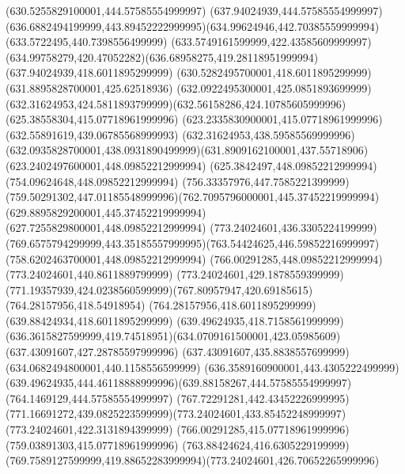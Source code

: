 {{	\closepath
	\moveto(630.5255829100001,444.57585554999997)
	\lineto(637.94024939,444.57585554999997)
	\curveto(636.6882494199999,443.89452222999995)(634.99624946,442.70385559999994)(633.5722495,440.7398556499999)
	\closepath
	\moveto(633.5749161599999,422.43585609999997)
	\curveto(634.99758279,420.47052282)(636.68958275,419.28118951999994)(637.94024939,418.6011895299999)
	\lineto(630.5282495700001,418.6011895299999)
	\closepath
	\moveto(631.8895828700001,425.62518936)
	\curveto(632.0922495300001,425.0851893699999)(632.31624953,424.5811893799999)(632.56158286,424.10785605999996)
	\lineto(625.38558304,415.07718961999996)
	\lineto(623.2335830900001,415.07718961999996)
	\closepath
	\moveto(632.55891619,439.06785568999993)
	\curveto(632.31624953,438.59585569999996)(632.0935828700001,438.0931890499999)(631.8909162100001,437.55718906)
	\lineto(623.2402497600001,448.09852212999994)
	\lineto(625.3842497,448.09852212999994)
	\closepath
	\moveto(754.09624648,448.09852212999994)
	\curveto(756.33357976,447.7585221399999)(759.50291302,447.01185548999996)(762.7095796000001,445.37452219999994)
	\lineto(629.8895829200001,445.37452219999994)
	\lineto(627.7255829800001,448.09852212999994)
	\closepath
	\moveto(773.24024601,436.3305224199999)
	\curveto(769.6575794299999,443.35185557999995)(763.54424625,446.59852216999997)(758.6202463700001,448.09852212999994)
	\lineto(766.00291285,448.09852212999994)
	\lineto(773.24024601,440.8611889799999)
	\closepath
	\moveto(773.24024601,429.1878559399999)
	\curveto(771.19357939,424.0238560599999)(767.80957947,420.69185615)(764.28157956,418.54918954)
	\lineto(764.28157956,418.6011895299999)
	\lineto(639.88424934,418.6011895299999)
	\curveto(639.49624935,418.7158561999999)(636.3615827599999,419.74518951)(634.0709161500001,423.05985609)
	\lineto(637.43091607,427.28785597999996)
	\lineto(637.43091607,435.8838557699999)
	\lineto(634.0682494800001,440.1158556599999)
	\curveto(636.3589160900001,443.4305222499999)(639.49624935,444.46118888999996)(639.88158267,444.57585554999997)
	\lineto(764.1469129,444.57585554999997)
	\curveto(767.72291281,442.43452226999995)(771.16691272,439.0825223599999)(773.24024601,433.85452248999997)
	\closepath
	\moveto(773.24024601,422.3131894399999)
	\lineto(766.00291285,415.07718961999996)
	\lineto(759.03891303,415.07718961999996)
	\curveto(763.88424624,416.6305229199999)(769.7589127599999,419.88652283999994)(773.24024601,426.70652265999996)
	\closepath
}
}
